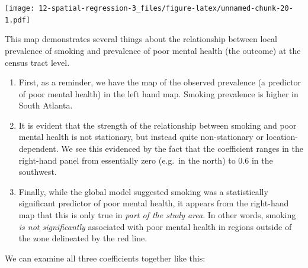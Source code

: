 \documentclass[
]{book}
\providecommand{\tightlist}{%
  \setlength{\itemsep}{0pt}\setlength{\parskip}{0pt}}
\begin{document}
\texttt{[image: 12-spatial-regression-3\_files/figure-latex/unnamed-chunk-20-1.pdf]}

This map demonstrates several things about the relationship between local prevalence of smoking and prevalence of poor mental health (the outcome) at the census tract level.

\begin{enumerate}
\def\labelenumi{\arabic{enumi}.}
\tightlist
\item
  First, as a reminder, we have the map of the observed prevalence (a predictor of poor mental health) in the left hand map. Smoking prevalence is higher in South Atlanta.
\item
  It is evident that the strength of the relationship between smoking and poor mental health is not stationary, but instead quite non-stationary or location-dependent. We see this evidenced by the fact that the coefficient ranges in the right-hand panel from essentially zero (e.g.~in the north) to 0.6 in the southwest.
\item
  Finally, while the global model suggested smoking was a statistically significant predictor of poor mental health, it appears from the right-hand map that this is only true in \emph{part of the study area}. In other words, smoking \emph{is not significantly} associated with poor mental health in regions outside of the zone delineated by the red line.
\end{enumerate}

We can examine all three coefficients together like this:
\end{document}

